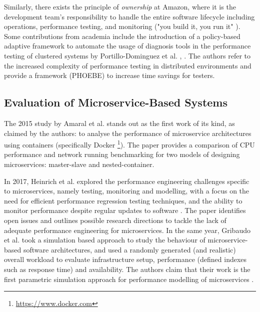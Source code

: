 Similarly, there exists the principle of \textit{ownership} at Amazon, where it is the development team's responsibility to handle the entire software lifecycle including operations, performance testing, and monitoring ("you build it, you run it" \cite{ohanlon06}). Some contributions from academia include the introduction of a policy-based adaptive framework to automate the usage of diagnosis tools in the performance testing of clustered systems by Portillo-Dominguez et al. \cite{portillo14}, \cite{portillo17}. The authors refer to the increased complexity of performance testing in distributed environments and provide a framework (PHOEBE) to increase time savings for testers.

\subsection{Evaluation of Microservice-Based Systems}

The 2015 study by Amaral et al. \cite{amaral15} stands out as the first work of its kind, as claimed by the authors: to analyse the performance of microservice architectures using containers (specifically Docker \footnote{\url{https://www.docker.com}}). The paper provides a comparison of CPU performance and network running benchmarking for two models of designing microservices: master-slave and nested-container.

In 2017, Heinrich et al. explored the performance engineering challenges specific to microservices, namely testing, monitoring and modelling, with a focus on the need for efficient performance regression testing techniques, and the ability to monitor performance despite regular updates to software \cite{heinrich17}. The paper identifies open issues and outlines possible research directions to tackle the lack of adequate performance engineering for microservices.  In the same year, Gribaudo et al. took a simulation based approach to study the behaviour of microservice-based software architectures, and used a randomly generated (and realistic) overall workload to evaluate infrastructure setup, performance (defined indexes such as response time) and availability. The authors claim that their work is the first parametric simulation approach for performance modelling of microservices \cite{gribaudo17}.

